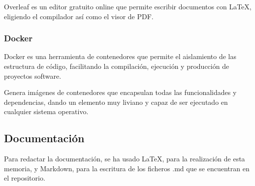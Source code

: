 Overleaf es un editor gratuito online que permite escribir documentos con \LaTeX, eligiendo el compilador así como el visor de PDF.


\subsubsection{Docker}
Docker \cite{Dockerov1:online} es una herramienta de contenedores que permite el aislamiento de las estructura de código, facilitando la compilación, ejecución y producción de proyectos software. 

Genera imágenes de contenedores que encapsulan todas las funcionalidades y dependencias, dando un elemento muy liviano y capaz de ser ejecutado en cualquier sistema operativo.

\subsection{Documentación}
Para redactar la documentación, se ha usado \LaTeX, para la realización de esta memoria, y Markdown, para la escritura de los ficheros .md que se encuentran en el repositorio.


